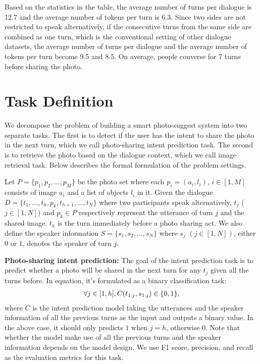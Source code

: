 \documentclass[11pt,a4paper]{article}
\begin{document}
Based on the statistics in the table, the average number of turns per dialogue is 12.7 and the average number of tokens per turn is 6.3. Since two sides are not restricted to speak alternatively, if the consecutive turns from the same side are combined as one turn, which is the conventional setting of other dialogue datasets, the average number of turns per dialogue and the average number of tokens per turn become 9.5 and 8.5. On average, people converse for 7 turns before sharing the photo. 

\section{Task Definition}
We decompose the problem of building a smart photo-suggest system into two separate tasks. The first is to detect if the user has the intent to share the photo in the next turn, which we call photo-sharing intent prediction task. The second is to retrieve the photo based on the dialogue context, which we call image retrieval task. 
Below describes the formal formulation of the problem settings.

Let $P = \{p_1, p_2, ..., p_M\}$ be the photo set where each $p_i = (a_i, l_i)$, $i\in[1, M]$ consists of image $a_i$ and a list of objects $l_i$ in it. Given the dialogue $D = \{t_1, ..., t_h, p_k, t_{h+1}, ..., t_N\}$ where two participants speak alternatively, $t_j$ ($j\in[1,N]$) and $p_k\in P$ respectively represent the utterance of turn $j$ and the shared image. $t_h$ is the turn immediately before a photo sharing act. We also define the speaker information $S = \{s_1, s_2, ..., s_N\}$ where $s_j$ $(j\in[1, N])$, either $0$ or $1$, denotes the speaker of turn $j$. 

\textbf{Photo-sharing intent prediction:} The goal of the intent prediction task is to predict whether a photo will be shared in the next turn for any $t_j$ given all the turns before. In equation, it's formulated as a binary classification task:
\begin{align}\label{eq:class}
    \small
    \forall j \in [1, h], C(t_{1:j}, s_{1:j}) \in \{0, 1\}, 
\end{align}
where $C$ is the intent prediction model taking the utterances and the speaker information of all the previous turns as the input and outputs a binary value. In the above case, it should only predicts $1$ when $j = h$, otherwise 0. Note that whether the model make use of all the previous turns and the speaker information depends on the model design. We use F1 score, precision, and recall as the evaluation metrics for this task.
\end{document}
